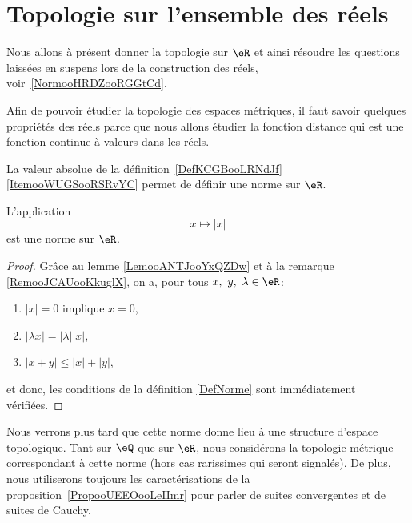 
\section{Topologie sur l'ensemble des réels}
\label{SECooGKHYooMwHQaD}

Nous allons à présent donner la topologie sur \( \eR\) et ainsi résoudre les questions laissées en suspens lors de la construction des réels, voir~\ref{NormooHRDZooRGGtCd}.


Afin de pouvoir étudier la topologie des espaces métriques, il faut savoir quelques propriétés des réels parce que nous allons étudier la fonction distance qui est une fonction continue à valeurs dans les réels.

La valeur absolue de la définition~\ref{DefKCGBooLRNdJf}\ref{ItemooWUGSooRSRvYC} permet de définir une norme sur \( \eR\).
\begin{lemma}
    L'application
    \begin{equation}
         x\mapsto | x |
    \end{equation}
     est une norme sur $\eR$.
\end{lemma}

\begin{proof}
  Grâce au lemme \ref{LemooANTJooYxQZDw} et à la remarque \ref{RemooJCAUooKkuglX}, on a, pour tous \(x,\ y,\ \lambda \in \eR \):
\begin{enumerate}
\item $| x |=0$ implique $x=0$,
\item $| \lambda x |=| \lambda | |x |$,
\item $| x+y |\leq | x |+| y |$,
\end{enumerate}
et donc, les conditions de la définition \ref{DefNorme} sont immédiatement vérifiées.
\end{proof}

\begin{normaltext}      \label{ooLCMFooQjMaxV}
    Nous verrons plus tard que cette norme donne lieu à une structure d'espace topologique. Tant sur \( \eQ\) que sur \( \eR\), nous considérons la topologie métrique correspondant à cette norme (hors cas rarissimes qui seront signalés). De plus, nous utiliserons toujours les caractérisations de la proposition~\ref{PropooUEEOooLeIImr} pour parler de suites convergentes et de suites de Cauchy.
\end{normaltext}

